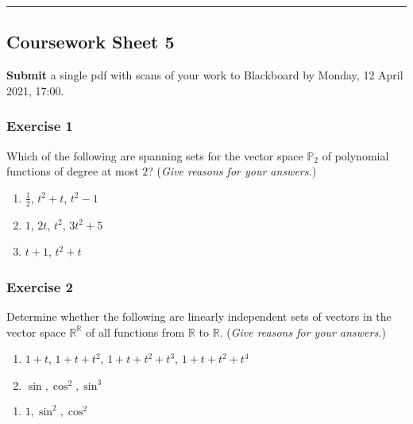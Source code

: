 \documentclass[
  12pt,
  a4paper,
  twoside]{article}
\providecommand{\tightlist}{%
  \setlength{\itemsep}{0pt}\setlength{\parskip}{0pt}}
\theoremstyle{plain}
\theoremstyle{definition}
\begin{document}
\begin{center}\rule{0.5\linewidth}{0.5pt}\end{center}

\hypertarget{coursework-sheet-5}{%
\subsection{Coursework Sheet 5}\label{coursework-sheet-5}}

\textbf{Submit} a single pdf with scans of your work to Blackboard by Monday, 12 April 2021, 17:00.

\hypertarget{exercise-1-5}{%
\subsubsection*{Exercise 1}\label{exercise-1-5}}

Which of the following are spanning sets for the vector space
\(\mathbb{P}_2\) of polynomial functions of degree at most \(2\)? (\emph{Give
reasons for your answers.})

\begin{enumerate}
\def\labelenumi{(\alph{enumi})}
\item
  \(\frac12\), \(t^2+t\), \(t^2-1\)
\item
  \(1\), \(2t\), \(t^2\), \(3t^2+5\)
\item
  \(t+1\), \(t^2+t\)
\end{enumerate}

\hypertarget{exercise-2-5}{%
\subsubsection*{Exercise 2}\label{exercise-2-5}}

Determine whether the following are linearly independent sets of
vectors in the vector space \(\mathbb{R}^\mathbb{R}\) of all functions from \(\mathbb{R}\)
to \(\mathbb{R}\). (\emph{Give reasons for your answers.})

\begin{enumerate}
\def\labelenumi{(\alph{enumi})}
\item
  \(1+t\), \(1+t+t^2\), \(1+t+t^2+t^3\), \(1+t+t^2+t^4\)
\item
  \(\sin, \cos^2, \sin^3\)
\end{enumerate}

\begin{enumerate}
\def\labelenumi{(\alph{enumi})}
\setcounter{enumi}{2}
\tightlist
\item
  \(1, \sin^2, \cos^2\)
\end{enumerate}
\end{document}
